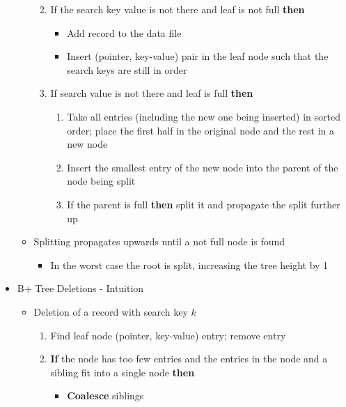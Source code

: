 \begin{itemize}[label=\(\rhd\)]
\begin{itemize}[label=\(\rhd\)]
\begin{enumerate}[left=0pt, itemsep=1ex, label=\textcolor{black}{\arabic*.}, font=\bfseries]
\begin{itemize}[label=\(\rhd\)]
        \end{itemize}
        \item If the search key value is not there and leaf is not full \textbf{then}
        \begin{itemize}[label=\(\rhd\)]
            \item[] Add record to the data file
            \item[] Insert (pointer, key-value) pair in the leaf node such that the search keys are still in order
        \end{itemize}
        \item If search value is not there and leaf is full \textbf{then}
        \begin{enumerate}[left=1em, itemsep=1ex, label=\textcolor{black}{\arabic{enumi}.\arabic*.}]
            \item Take all entries (including the new one being inserted) in sorted order; place the first half in the original node and the rest in a new node
            \item Insert the smallest entry of the new node into the parent of the node being split
            \item If the parent is full \textbf{then} split it and propagate the split further up
        \end{enumerate}
    \end{enumerate}
    \item Splitting propagates upwards until a not full node is found
    \begin{itemize}[label=\(\rhd\)]
        \item In the worst case the root is split, increasing the tree height by 1
    \end{itemize}
\end{itemize}
    \item B+ Tree Deletions - Intuition
    \begin{itemize}[label=\(\rhd\)]
        \item Deletion of a record with search key $k$
        \begin{enumerate}
            \item Find leaf node (pointer, key-value) entry; remove entry
            \item \textbf{If} the node has too few entries and the entries in the node and a sibling fit into a single node \textbf{then}
            \begin{itemize}[label=\(\rhd\)]
                \item[] \textbf{Coalesce} siblings

\end{itemize}
\end{enumerate}
\end{itemize}
\end{itemize}
